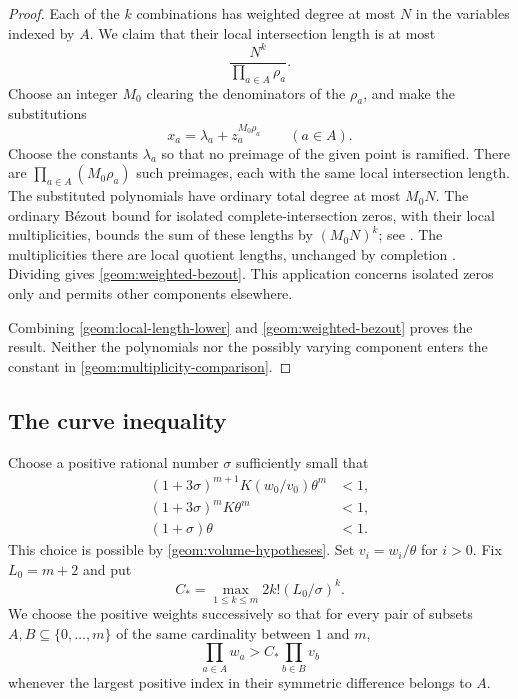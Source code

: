 \documentclass[11pt]{article}
\theoremstyle{definition}
\theoremstyle{remark}
\numberwithin{equation}{section}
\begin{document}
\begin{proof}
Each of the $k$ combinations has weighted degree at most $N$ in the
variables indexed by $A$. We claim that their local intersection length
is at most
\begin{equation}
\label{geom:weighted-bezout}
 \frac{N^k}{\prod_{a\in A}\rho_a}.
\end{equation}
Choose an integer $M_0$ clearing the denominators of the $\rho_a$, and
make the substitutions
\[
 x_a=\lambda_a+z_a^{M_0\rho_a}\qquad(a\in A).
\]
Choose the constants $\lambda_a$ so that no preimage of the given point
is ramified. There are $\prod_{a\in A}(M_0\rho_a)$ such preimages, each
with the same local intersection length. The substituted polynomials
have ordinary total degree at most $M_0N$. The ordinary B\'ezout bound
for isolated complete-intersection zeros, with their local
multiplicities, bounds the sum of these lengths by $(M_0N)^k$;
see \cite[Corollary~VIII.3, p.~144]{mondal2021}.
The multiplicities there are local quotient lengths, unchanged by
completion \cite[Section~IV.4.2]{mondal2021}.
Dividing gives \eqref{geom:weighted-bezout}.
This application concerns isolated zeros only and permits other
components elsewhere.

Combining \eqref{geom:local-length-lower} and
\eqref{geom:weighted-bezout} proves the result. Neither the
polynomials nor the possibly varying component enters the constant in
\eqref{geom:multiplicity-comparison}.
\end{proof}

\subsection{The curve inequality}

Choose a positive rational number $\sigma$ sufficiently small that
\begin{equation}
\label{geom:sigma}
 \begin{split}
 (1+3\sigma)^{m+1}K(w_0/v_0)\theta^m&<1,\\
 (1+3\sigma)^mK\theta^m&<1,\\
 (1+\sigma)\theta&<1.
 \end{split}
\end{equation}
This choice is possible by \eqref{geom:volume-hypotheses}. Set $v_i=w_i/\theta$
for $i>0$. Fix $L_0=m+2$ and put
\begin{equation}
\label{geom:constant}
 C_* =\max_{1\le k\le m}2k!(L_0/\sigma)^k.
\end{equation}
We choose the positive weights successively so that for every pair of
subsets $A,B\subseteq\{0,\ldots,m\}$ of the same cardinality between
$1$ and $m$,
\begin{equation}
\label{geom:separation}
 \prod_{a\in A}w_a>C_*\prod_{b\in B}v_b
\end{equation}
whenever the largest positive index in their symmetric difference belongs
to $A$.
\end{document}

